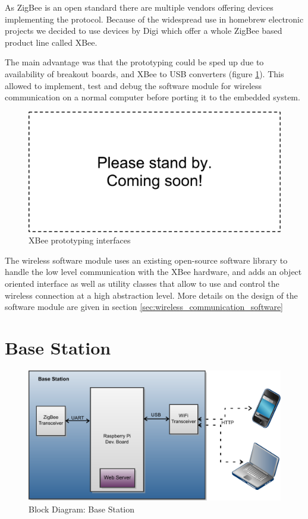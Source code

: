 As ZigBee is an open standard there are multiple vendors offering devices implementing the protocol. Because of the widespread use in homebrew electronic projects we decided to use devices by Digi which offer a whole ZigBee based product line called XBee. 

The main advantage was that the prototyping could be sped up due to availability of breakout boards, and XBee to USB converters (figure \ref{fig:xbee_prototyping_interfaces}). This allowed to implement, test and debug the software module for wireless communication on a normal computer before porting it to the embedded system.

\begin{figure}
\includegraphics[width=\textwidth]{Images/dummy}
\caption{XBee prototyping interfaces}
\label{fig:xbee_prototyping_interfaces}
\end{figure}

The wireless software module uses an existing open-source software library to handle the low level communication with the XBee hardware, and adds an object oriented interface as well as utility classes that allow to use and control the wireless connection at a high abstraction level. More details on the design of the software module are given in section \ref{sec:wireless_communication_software}


\section{Base Station}
\begin{figure}[htb]
\includegraphics[width=\textwidth]{Images/BaseStationBlockDiagram}
\caption{Block Diagram: Base Station}
\label{fig:block_base_station}
\end{figure}

